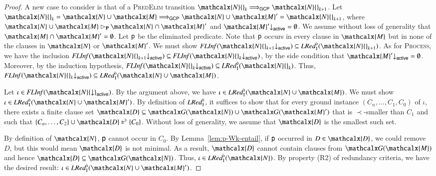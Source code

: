 \begin{rep}
\begin{proof}
\begin{sloppypar}
   A new case to consider is that of a \textsc{PredElim} transition
   $\mathcalx{N}{}_{k} \Longrightarrow_\mathsf{GCP} \mathcalx{N}{}_{k+1}$.
   Let $\mathcalx{N}{}_{k} = \mathcalx{N} \cup \mathcalx{M}
   \Longrightarrow_\mathsf{GCP} \mathcalx{N} \cup \mathcalx{M}' = \mathcalx{N}{}_{k+1}$,
   where $\mathcalx{N} \cup \mathcalx{M} \rhd_\mathbf{P}
   \mathcalx{N} \cap \mathcalx{M}'$ and
   $\mathcalx{M}'{\downarrow}_\mathsf{active} = \emptyset$.
   We assume without loss of generality that $\mathcalx{M} \cap \mathcalx{M}' =
   \emptyset$.
   Let $\mathsf{p}$ be the eliminated predicate. Note that $\mathsf{p}$ occurs in every
   clause in $\mathcalx{M}$ but in none of the clauses in $\mathcalx{N}$ or
   $\mathcalx{M}'$.
   We must show $\FLInf(\mathcalx{N}{}_{k+1} {\downarrow}_\mathsf{active})
   \subseteq \LRedIWk(\mathcalx{N}{}_{k+1})$.
   As for \textsc{Process}, we have the inclusion
   $\FLInf(\mathcalx{N}{}_{k+1} {\downarrow}_\mathsf{active})
   \subseteq \FLInf(\mathcalx{N}{}_k {\downarrow}_\mathsf{active})$,
   by the side condition that
   $\mathcalx{M}'{\downarrow}_\mathsf{active} = \emptyset$.
   Moreover, by the induction hypothesis,
   $\FLInf(\mathcalx{N}{}_k {\downarrow}_\mathsf{active})
   \subseteq \LRedIWk(\mathcalx{N}{}_k)$. Thus,
   $\FLInf(\mathcalx{N}{}_k {\downarrow}_\mathsf{active})
   \subseteq \LRedIWk(\mathcalx{N} \cup \mathcalx{M})$.
\end{sloppypar}

Let $\iota \in \FLInf(\mathcalx{N} {\downarrow}_\mathsf{active})$.
By the argument above, we have
$\iota \in \LRedIWk(\mathcalx{N} \cup \mathcalx{M})$.
We must
show $\iota \in \LRedIWk(\mathcalx{N} \cup \mathcalx{M}')$.
%
By definition of $\mathit{LRed}_\mathrm{I}^{\flat}$, it suffices to show that for
every ground instance $(C_n,\ldots,C_1,C_0)$ of $\iota$, there exists a finite
clause set $\mathcalx{D} \subseteq \gnd(\mathcalx{N}) \cup \gnd(\mathcalx{M}')$
that is $\prec$-smaller than $C_1$ and such that
$\{C_n,\ldots,C_2\} \cup \mathcalx{D} \modelsWk \{C_0\}$.
Without loss of generality, we assume that $\mathcalx{D}$ is the smallest such
set.

By definition of $\mathcalx{N}$, $\mathsf{p}$ cannot occur in $C_0$.
By Lemma~\ref{lem:p-Wk-entail}, if $\mathsf{p}$ occurred in $D \in \mathcalx{D}$,
we could remove $D$, but this would mean $\mathcalx{D}$ is not minimal.
As a result, $\mathcalx{D}$ cannot contain clauses from $\gnd(\mathcalx{M})$ and
hence $\mathcalx{D} \subseteq \gnd(\mathcalx{N})$. Thus,
$\iota \in \LRedIWk(\mathcalx{N})$. By property (R2) of
redundancy criteria, we have the desired result: $\iota \in
\LRedIWk(\mathcalx{N} \cup \mathcalx{M}')$.
\end{proof}


\end{rep}
